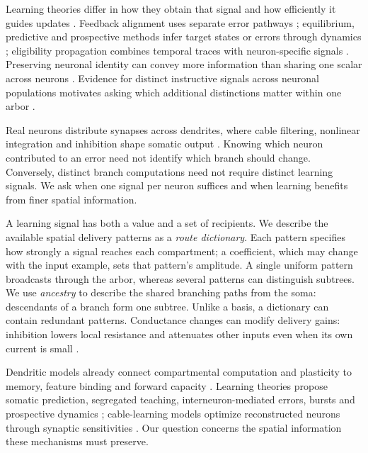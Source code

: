 \documentclass[11pt]{article}
\begin{document}
Learning theories differ in how they obtain that signal and how efficiently it guides updates \citep{werfel2005learning}. Feedback alignment uses separate error pathways \citep{lillicrap2016feedback,nokland2016dfa}; equilibrium, predictive and prospective methods infer target states or errors through dynamics \citep{scellier2017equilibrium,whittington2017predictive,song2024prospective}; eligibility propagation combines temporal traces with neuron-specific signals \citep{bellec2020eprop}. Preserving neuronal identity can convey more information than sharing one scalar across neurons \citep{whittington2019theories,lillicrap2020backprop}. Evidence for distinct instructive signals across neuronal populations motivates asking which additional distinctions matter within one arbor \citep{francioni2026vectorized}.

Real neurons distribute synapses across dendrites, where cable filtering, nonlinear integration and inhibition shape somatic output \citep{rall1962dendrites,koch1999biophysics,poirazi2003pyramidal,london2005dendritic,spruston2008pyramidal,branco2010single,larkum2013cellular}. Knowing which neuron contributed to an error need not identify which branch should change. Conversely, distinct branch computations need not require distinct learning signals. We ask when one signal per neuron suffices and when learning benefits from finer spatial information.

A learning signal has both a value and a set of recipients. We describe the available spatial delivery patterns as a \emph{route dictionary}. Each pattern specifies how strongly a signal reaches each compartment; a coefficient, which may change with the input example, sets that pattern's amplitude. A single uniform pattern broadcasts through the arbor, whereas several patterns can distinguish subtrees. We use \emph{ancestry} to describe the shared branching paths from the soma: descendants of a branch form one subtree. Unlike a basis, a dictionary can contain redundant patterns. Conductance changes can modify delivery gains: inhibition lowers local resistance and attenuates other inputs even when its own current is small \citep{koch1983nonlinear,holt1997shunting,chance2002gain,gidon2012inhibition,lovettbarron2012regulation}.

Dendritic models already connect compartmental computation and plasticity to memory, feature binding and forward capacity \citep{poirazi2001capacity,legenstein2011branch,jones2021successive,beniaguev2021single}. Learning theories propose somatic prediction, segregated teaching, interneuron-mediated errors, bursts and prospective dynamics \citep{urbanczik2014dendritic,schiess2016somatodendritic,guerguiev2017segregated,sacramento2018dendritic,payeur2021burst,ellenberger2026gle,richards2019dendritic}; cable-learning models optimize reconstructed neurons through synaptic sensitivities \citep{bicknell2021synaptic}. Our question concerns the spatial information these mechanisms must preserve.
\end{document}
